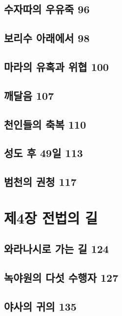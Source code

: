 \documentclass[12pt, a4paper, oneside]{book}
\let\stdsection\section
\renewcommand\section{\newpage\stdsection}
\begin{document}
	\section{수자따의 우유죽 96 }

	\section{보리수 아래에서 98 }

	\section{마라의 유혹과 위협 100 }

	\section{깨달음 107 }

	\section{천인들의 축복 110 }

	\section{성도 후 49일 113 }

	\section{범천의 권청 117}





	\chapter{제4장 전법의 길}
	\noptcrule
	\parttoc				

	\section{와라나시로 가는 길 124 }

	\section{녹야원의 다섯 수행자 127 }

	\section{야사의 귀의 135 }
\end{document}
